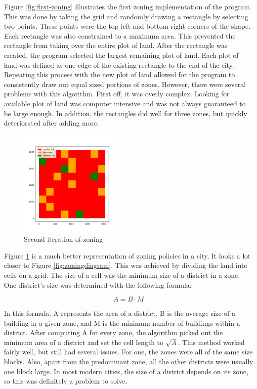 \documentclass[11pt]{article}
\begin{document}
\begin{multicols}{2}
    \quad Figure \ref{fig:first-zoning} illustrates the first zoning implementation of the program. This was done by taking the grid and randomly drawing a rectangle by selecting two points. These points were the top left and bottom right corners of the shape. Each rectangle was also constrained to a maximum area. This prevented the rectangle from taking over the entire plot of land. After the rectangle was created, the program selected the largest remaining plot of land. Each plot of land was defined as one edge of the existing rectangle to the end of the city. Repeating this process with the new plot of land allowed for the program to consistently draw out equal sized portions of zones. However, there were several problems with this algorithm. First off, it was overly complex. Looking for available plot of land was computer intensive and was not always guaranteed to be large enough. In addition, the rectangles did well for three zones, but quickly deteriorated after adding more. 

    \begin{figure}[H]
        \centering
        \vspace{-1em}
        \includegraphics[width=0.45\textwidth]{images/secondzoning.png}
        \caption{Second iteration of zoning}
        \label{fig:second-zoning}
    \end{figure}

    \quad Figure \ref{fig:second-zoning} is a much better representation of zoning policies in a city. It looks a lot closer to Figure \ref{fig:zoningdiagram}. This was achieved by dividing the land into cells on a grid. The size of a cell was the minimum size of a district in a zone. One district's size was determined with the following formula: 

    \[A = B \cdot M\]

    In this formula, A represents the area of a district, B is the average size of a building in a given zone, and M is the minimum number of buildings within a district. After computing A for every zone, the algorithm picked out the minimum area of a district and set the cell length to \(\sqrt{A}\). This method worked fairly well, but still had several issues. For one, the zones were all of the same size blocks. Also, apart from the predominant zone, all the other districts were usually one block large. In most modern cities, the size of a district depends on its zone, so this was definitely a problem to solve.


\end{multicols}
\end{document}
